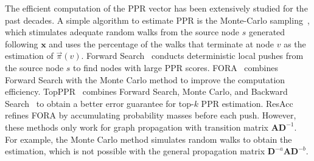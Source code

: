  
The efficient computation of the PPR vector has been extensively studied for the past decades. A simple algorithm to estimate PPR is the Monte-Carlo sampling~\cite{Fogaras2005MC}, which stimulates adequate random walks from the source node $s$ generated following $\bm{x}$ and uses the percentage of the walks that terminate at node $v$ as the estimation of $\vec{\pi}(v)$.  Forward Search~\cite{FOCS06_FS} conducts deterministic local pushes from the source node $s$ to find nodes with large PPR scores. FORA~\cite{Wang2017FORA} combines Forward Search with the Monte Carlo method to improve the computation efficiency. TopPPR~\cite{wei2018topppr} combines Forward Search, Monte Carlo, and Backward Search~\cite{lofgren2013personalized} to obtain a better error guarantee for  top-$k$ PPR estimation. ResAcc~\cite{lin2020index} refines FORA by accumulating probability masses before each push.  However, these methods only work for graph propagation with transition matrix $\mathbf{A} \mathbf{D}^{-1}$. For example, the Monte Carlo method simulates random walks to obtain the estimation, which is not possible with the general propagation matrix $\mathbf{D}^{-a}\mathbf{A}\mathbf{D}^{-b}$. 
 
